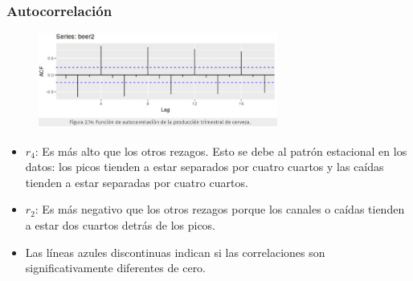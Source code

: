 \documentclass[10pt]{beamer}
\begin{document}
\begin{frame}[fragile]
\frametitle{Autocorrelación}


\begin{figure}
\begin{center}
    \includegraphics[width=0.7\textwidth]{Imagen29.JPG}
\end{center}
\end{figure}

\vspace{3mm}

{\small
\begin{itemize}
\item $r_4$: Es más alto que los otros rezagos. Esto se debe al patrón estacional en los datos: los picos tienden a estar separados por cuatro cuartos y las caídas tienden a estar separadas por cuatro cuartos.

\vspace{3mm}
\item $r_2$: Es más negativo que los otros rezagos porque los canales o caídas tienden a estar dos cuartos detrás de los picos.
\vspace{3mm}
\item Las líneas azules discontinuas indican si las correlaciones son significativamente diferentes de cero.

\end{itemize}
}

\end{frame}


\end{document}

